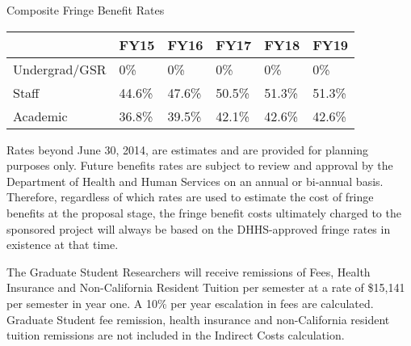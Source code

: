 \documentclass[onecolumn,11pt]{aastex}
\begin{document}
\begin{table}
\centering
\label{tab:fringeBenefits}
Composite Fringe Benefit Rates
\begin{tabular}{| l | l | l | l | l | l |}
\hline
            ~ & FY15    & FY16    & FY17   & FY18   & FY19 \\ \hline \hline
Undergrad/GSR &	0\%     & 0\%     & 0\%    & 0\%    &  0\% \\ \hline
Staff         & 44.6\%  & 47.6\%  & 50.5\% & 51.3\% &  51.3\% \\ \hline
Academic      & 36.8\%  & 39.5\%  & 42.1\% & 42.6\% &   42.6\% \\ \hline
\hline
\end{tabular}
\end{table}


Rates beyond June 30, 2014, are estimates and are provided for planning purposes only. Future benefits rates are subject to review and approval by the Department of Health and Human Services on an annual or bi-annual basis. Therefore, regardless of which rates are used to estimate the cost of fringe benefits at the proposal stage, the fringe benefit costs ultimately charged to the sponsored project will always be based on the DHHS-approved fringe rates in existence at that time.

The Graduate Student Researchers will receive remissions of Fees, Health Insurance and Non-California Resident Tuition per semester at a rate of \$15,141 per semester in year one.  A 10\% per year escalation in fees are calculated.  Graduate Student fee remission, health insurance and non-California resident tuition remissions are not included in the Indirect Costs calculation. 
\end{document}
